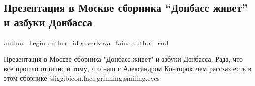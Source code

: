  
 
 
 
 
 
\subsection{Презентация в Москве сборника \enquote{Донбасс живет} и азбуки Донбасса}
\label{sec:15_09_2021.fb.savenkova_faina.1.moskva_prezentacia_donbass_zhivet_azbuka}
 
\ifcmt
 author_begin
   author_id savenkova_faina
 author_end
\fi

Презентация в Москве сборника "Донбасс живет" и азбуки Донбасса. Рада, что все
прошло отлично и тому, что наш с Александром Конторовичем рассказ есть в этом
сборнике  @igg{fbicon.face.grinning.smiling.eyes} 



